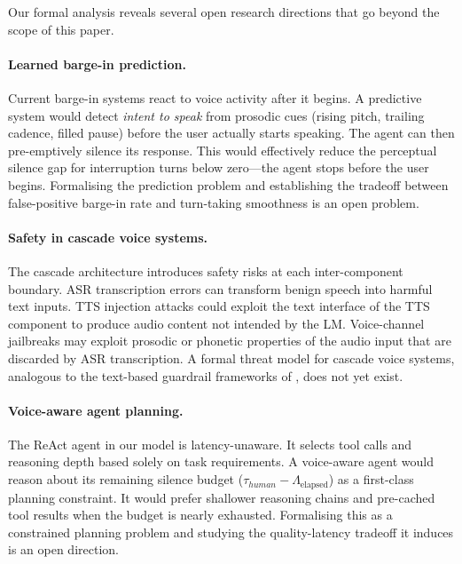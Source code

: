 Our formal analysis reveals several open research directions that go beyond the scope of this paper.

\paragraph{Learned barge-in prediction.}
Current barge-in systems react to voice activity after it begins.
A predictive system would detect \emph{intent to speak} from prosodic cues (rising pitch, trailing cadence, filled pause) before the user actually starts speaking.
The agent can then pre-emptively silence its response.
This would effectively reduce the perceptual silence gap for interruption turns below zero---the agent stops before the user begins.
Formalising the prediction problem and establishing the tradeoff between false-positive barge-in rate and turn-taking smoothness is an open problem.

\paragraph{Safety in cascade voice systems.}
The cascade architecture introduces safety risks at each inter-component boundary.
ASR transcription errors can transform benign speech into harmful text inputs.
TTS injection attacks could exploit the text interface of the TTS component to produce audio content not intended by the LM.
Voice-channel jailbreaks may exploit prosodic or phonetic properties of the audio input that are discarded by ASR transcription.
A formal threat model for cascade voice systems, analogous to the text-based guardrail frameworks of \citet{dong2024building}, does not yet exist.

\paragraph{Voice-aware agent planning.}
The ReAct agent in our model is latency-unaware.
It selects tool calls and reasoning depth based solely on task requirements.
A voice-aware agent would reason about its remaining silence budget ($\tau_{human} - \Lambda_{\text{elapsed}}$) as a first-class planning constraint.
It would prefer shallower reasoning chains and pre-cached tool results when the budget is nearly exhausted.
Formalising this as a constrained planning problem and studying the quality-latency tradeoff it induces is an open direction.

